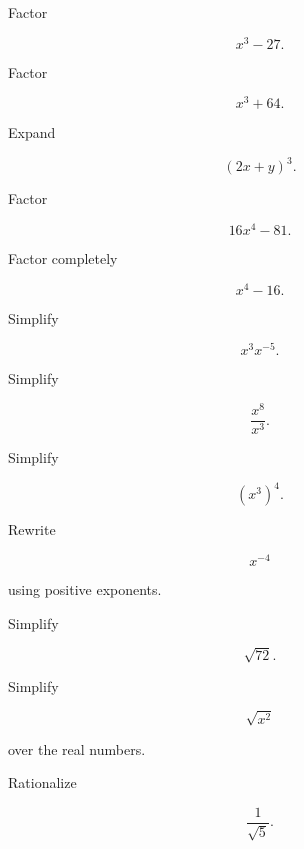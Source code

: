 \begin{exercise}[1]
Factor

\[
x^3-27.
\]
\end{exercise}

\begin{exercise}[1]
Factor

\[
x^3+64.
\]
\end{exercise}

\begin{exercise}[2]
Expand

\[
(2x+y)^3.
\]
\end{exercise}

\begin{exercise}[2]
Factor

\[
16x^4-81.
\]
\end{exercise}

\begin{exercise}[2]
Factor completely

\[
x^4-16.
\]
\end{exercise}

\begin{exercise}[2]
Simplify

\[
x^3x^{-5}.
\]
\end{exercise}

\begin{exercise}[2]
Simplify

\[
\frac{x^8}{x^3}.
\]
\end{exercise}

\begin{exercise}[2]
Simplify

\[
(x^3)^4.
\]
\end{exercise}

\begin{exercise}[2]
Rewrite

\[
x^{-4}
\]

using positive exponents.
\end{exercise}

\begin{exercise}[2]
Simplify

\[
\sqrt{72}.
\]
\end{exercise}

\begin{exercise}[2]
Simplify

\[
\sqrt{x^2}
\]

over the real numbers.
\end{exercise}

\begin{exercise}[2]
Rationalize

\[
\frac{1}{\sqrt5}.
\]
\end{exercise}

